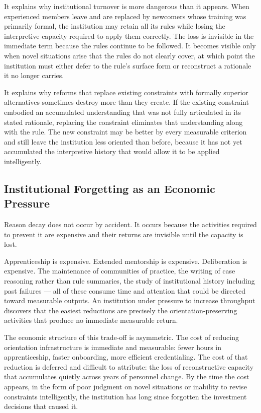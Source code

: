 It explains why institutional turnover is more dangerous than it appears.
When experienced members leave and are replaced by newcomers whose training
was primarily formal, the institution may retain all its rules while losing
the interpretive capacity required to apply them correctly. The loss is
invisible in the immediate term because the rules continue to be followed.
It becomes visible only when novel situations arise that the rules do not
clearly cover, at which point the institution must either defer to the rule's
surface form or reconstruct a rationale it no longer carries.

It explains why reforms that replace existing constraints with formally
superior alternatives sometimes destroy more than they create. If the
existing constraint embodied an accumulated understanding that was not
fully articulated in its stated rationale, replacing the constraint
eliminates that understanding along with the rule. The new constraint
may be better by every measurable criterion and still leave the institution
less oriented than before, because it has not yet accumulated the interpretive
history that would allow it to be applied intelligently.

\subsection*{Institutional Forgetting as an Economic Pressure}

Reason decay does not occur by accident. It occurs because the activities
required to prevent it are expensive and their returns are invisible until
the capacity is lost.

Apprenticeship is expensive. Extended mentorship is expensive. Deliberation
is expensive. The maintenance of communities of practice, the writing of
case reasoning rather than rule summaries, the study of institutional history
including past failures --- all of these consume time and attention that could
be directed toward measurable outputs. An institution under pressure to
increase throughput discovers that the easiest reductions are precisely the
orientation-preserving activities that produce no immediate measurable return.

The economic structure of this trade-off is asymmetric. The cost of reducing
orientation infrastructure is immediate and measurable: fewer hours in
apprenticeship, faster onboarding, more efficient credentialing. The cost
of that reduction is deferred and difficult to attribute: the loss of
reconstructive capacity that accumulates quietly across years of personnel
change. By the time the cost appears, in the form of poor judgment on novel
situations or inability to revise constraints intelligently, the institution
has long since forgotten the investment decisions that caused it.

